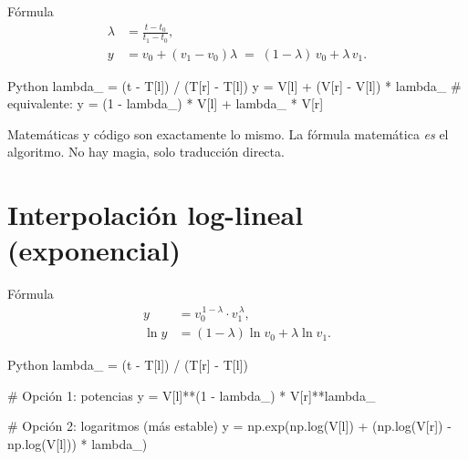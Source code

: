 \documentclass{claudeeditorial}
\begin{document}
\begin{ClaudeCard}{Fórmula}
\begin{align*}
  \lambda &= \frac{t - t_0}{t_1 - t_0}, \\
  y &= v_0 + (v_1 - v_0)\lambda \;=\; (1-\lambda)\,v_0 + \lambda\,v_1.
\end{align*}
\end{ClaudeCard}

\begin{ClaudeCode}[title={interpolación lineal}]{Python}
lambda_ = (t - T[l]) / (T[r] - T[l])
y       = V[l] + (V[r] - V[l]) * lambda_
# equivalente:
y       = (1 - lambda_) * V[l] + lambda_ * V[r]
\end{ClaudeCode}

 Matemáticas y código son exactamente lo mismo. La fórmula matemática \emph{es} el algoritmo. No hay magia, solo traducción directa.

\section{Interpolación log-lineal (exponencial)}

\begin{ClaudeCard}{Fórmula}
\begin{align*}
  y &= v_0^{\,1-\lambda}\cdot v_1^{\,\lambda}, \\
  \ln y &= (1-\lambda)\ln v_0 + \lambda\ln v_1.
\end{align*}
\end{ClaudeCard}

\begin{ClaudeCode}[title={interpolación log-lineal}]{Python}
lambda_ = (t - T[l]) / (T[r] - T[l])

# Opción 1: potencias
y = V[l]**(1 - lambda_) * V[r]**lambda_

# Opción 2: logaritmos (más estable)
y = np.exp(np.log(V[l]) + (np.log(V[r]) - np.log(V[l])) * lambda_)
\end{ClaudeCode}

\end{document}
